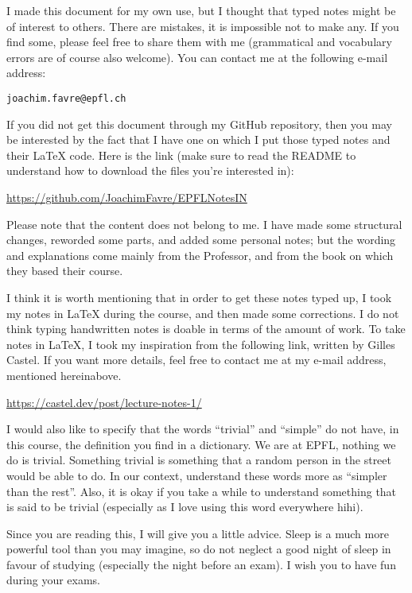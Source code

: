 I made this document for my own use, but I thought that typed notes might be of interest to others. There are mistakes, it is impossible not to make any. If you find some, please feel free to share them with me (grammatical and vocabulary errors are of course also welcome). You can contact me at the following e-mail address:
\begin{center}
    \texttt{joachim.favre@epfl.ch}
\end{center}

If you did not get this document through my GitHub repository, then you may be interested by the fact that I have one on which I put those typed notes and their \LaTeX{} code. Here is the link (make sure to read the README to understand how to download the files you're interested in):
\begin{center}
    \url{https://github.com/JoachimFavre/EPFLNotesIN}
\end{center}

Please note that the content does not belong to me. I have made some structural changes, reworded some parts, and added some personal notes; but the wording and explanations come mainly from the Professor, and from the book on which they based their course.

I think it is worth mentioning that in order to get these notes typed up, I took my notes in \LaTeX{} during the course, and then made some corrections. I do not think typing handwritten notes is doable in terms of the amount of work. To take notes in \LaTeX{}, I took my inspiration from the following link, written by Gilles Castel. If you want more details, feel free to contact me at my e-mail address, mentioned hereinabove.
\begin{center}
    \url{https://castel.dev/post/lecture-notes-1/}
\end{center}

I would also like to specify that the words ``trivial'' and ``simple'' do not have, in this course, the definition you find in a dictionary. We are at EPFL, nothing we do is trivial. Something trivial is something that a random person in the street would be able to do. In our context, understand these words more as ``simpler than the rest''. Also, it is okay if you take a while to understand something that is said to be trivial (especially as I love using this word everywhere hihi).

Since you are reading this, I will give you a little advice. Sleep is a much more powerful tool than you may imagine, so do not neglect a good night of sleep in favour of studying (especially the night before an exam). I wish you to have fun during your exams.
